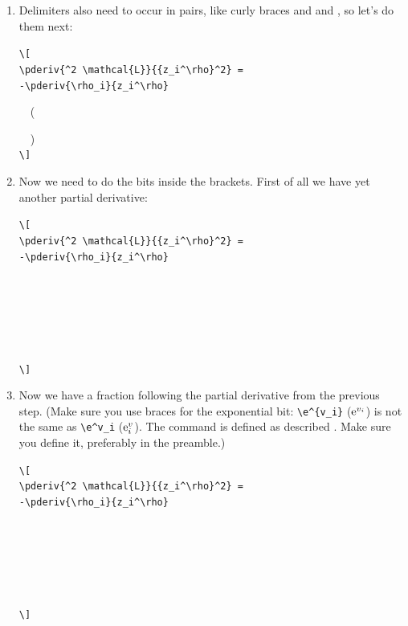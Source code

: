 \begin{enumerate}
\item Delimiters also need to occur in pairs, like curly braces and 
 and , so let's do them next:
\begin{code}
{\color{midgray}\verb|\[|\\
\verb|\pderiv{^2 \mathcal{L}}{{z_i^\rho}^2} =|\\
\verb|-\pderiv{\rho_i}{z_i^\rho}|}\\
\strut~~(\\
\strut~~)\\
{\color{midgray}\verb|\]|}
\end{code}\screenpagebreak

\item Now we need to do the bits inside the brackets.  First of all 
we have yet another partial derivative:
\begin{code}
{\color{midgray}\verb|\[|\\
\verb|\pderiv{^2 \mathcal{L}}{{z_i^\rho}^2} =|\\
\verb|-\pderiv{\rho_i}{z_i^\rho}|\\
\strut~~}\\
\strut~~~~\\
{\color{midgray}~~\\
\verb|\]|}
\end{code}

\item Now we have a fraction following the partial derivative from
the previous step.
(Make sure you use braces for the exponential bit: \verb|\e^{v_i}|
($\mathrm{e}^{v_i}$) is not the same as \verb|\e^v_i| ($\mathrm{e}^v_i$). The
command  is defined as described
.
Make sure you define it, preferably in the \gls{preamble}.)
\begin{code}
{\color{midgray}\verb|\[|\\
\verb|\pderiv{^2 \mathcal{L}}{{z_i^\rho}^2} =|\\
\verb|-\pderiv{\rho_i}{z_i^\rho}|\\
\strut~~\\
\strut~~~~} \\
{\color{midgray}~~\\
\verb|\]|}
\end{code}


\end{enumerate}
